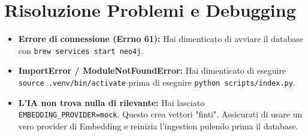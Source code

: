 \documentclass[12pt,a4paper]{article}
\begin{document}
\section{Risoluzione Problemi e Debugging}
\begin{itemize}
    \item \textbf{Errore di connessione (Errno 61):} Hai dimenticato di avviare il database con \texttt{brew services start neo4j}.
    \item \textbf{ImportError / ModuleNotFoundError:} Hai dimenticato di eseguire \texttt{source .venv/bin/activate} prima di eseguire \texttt{python scripts/index.py}.
    \item \textbf{L'IA non trova nulla di rilevante:} Hai lasciato \texttt{EMBEDDING\_PROVIDER=mock}. Questo crea vettori "finti". Assicurati di usare un vero provider di Embedding e reinizia l'ingestion pulendo prima il database.
\end{itemize}
\end{document}
